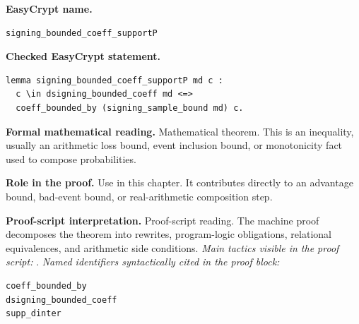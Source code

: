 \begin{formaltheorem}
\noindent\textbf{EasyCrypt name.}
\begin{lstlisting}[language=EasyCrypt,basicstyle=\ttfamily\scriptsize]
signing_bounded_coeff_supportP
\end{lstlisting}
\noindent\textbf{Checked EasyCrypt statement.}
\begin{lstlisting}[language=EasyCrypt,basicstyle=\ttfamily\scriptsize]
lemma signing_bounded_coeff_supportP md c :
  c \in dsigning_bounded_coeff md <=>
  coeff_bounded_by (signing_sample_bound md) c.
\end{lstlisting}
\noindent\textbf{Formal mathematical reading.}
Mathematical theorem. This is an inequality, usually an arithmetic loss bound, event inclusion bound, or monotonicity fact used to compose probabilities.

\noindent\textbf{Role in the proof.}
Use in this chapter. It contributes directly to an advantage bound, bad-event bound, or real-arithmetic composition step.

\noindent\textbf{Proof-script interpretation.}
Proof-script reading. The machine proof decomposes the theorem into rewrites, program-logic obligations, relational equivalences, and arithmetic side conditions.
\emph{Main tactics visible in the proof script:} .
\emph{Named identifiers syntactically cited in the proof block:}
\begin{lstlisting}[language=EasyCrypt,basicstyle=\ttfamily\scriptsize]
coeff_bounded_by
dsigning_bounded_coeff
supp_dinter
\end{lstlisting}

\end{formaltheorem}

